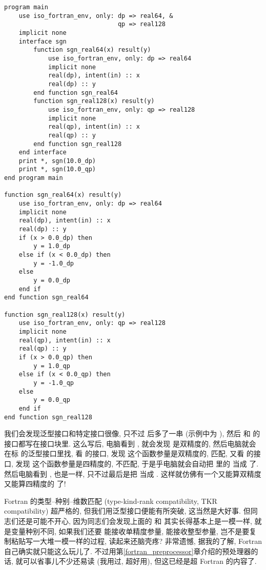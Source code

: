 \begin{lstlisting} 
program main
    use iso_fortran_env, only: dp => real64, &
                               qp => real128
    implicit none
    interface sgn
        function sgn_real64(x) result(y)
            use iso_fortran_env, only: dp => real64
            implicit none
            real(dp), intent(in) :: x
            real(dp) :: y
        end function sgn_real64
        function sgn_real128(x) result(y)
            use iso_fortran_env, only: qp => real128
            implicit none
            real(qp), intent(in) :: x
            real(qp) :: y
        end function sgn_real128
    end interface
    print *, sgn(10.0_dp)
    print *, sgn(10.0_qp)
end program main

function sgn_real64(x) result(y)
    use iso_fortran_env, only: dp => real64
    implicit none
    real(dp), intent(in) :: x
    real(dp) :: y
    if (x > 0.0_dp) then
        y = 1.0_dp
    else if (x < 0.0_dp) then
        y = -1.0_dp
    else
        y = 0.0_dp
    end if
end function sgn_real64

function sgn_real128(x) result(y)
    use iso_fortran_env, only: qp => real128
    implicit none
    real(qp), intent(in) :: x
    real(qp) :: y
    if (x > 0.0_qp) then
        y = 1.0_qp
    else if (x < 0.0_qp) then
        y = -1.0_qp
    else
        y = 0.0_qp
    end if
end function sgn_real128
\end{lstlisting} 
我们会发现泛型接口和特定接口很像, 只不过  后多了一串 (示例中为 ), 然后  和  的接口都写在接口块里. 这么写后, 电脑看到 , 就会发现  是双精度的, 然后电脑就会在标  的泛型接口里找, 看  的接口, 发现  这个函数参量是双精度的, 匹配, 又看  的接口, 发现  这个函数参量是四精度的, 不匹配, 于是乎电脑就会自动把  里的  当成  了. 然后电脑看到 , 也是一样, 只不过最后是把  当成 . 这样就仿佛有一个又能算双精度又能算四精度的  了!

Fortran 的类型--种别--维数匹配 (type-kind-rank compatibility, TKR compatibility) 超严格的, 但我们用泛型接口便能有所突破, 这当然是大好事. 但同志们还是可能不开心, 因为同志们会发现上面的  和  其实长得基本上是一模一样, 就是变量种别不同, 如果我们还要  能接收单精度参量, 能接收整型参量, 岂不是要复制粘贴写一大堆一模一样的过程, 读起来还脑壳疼? 非常遗憾, 据我的了解, Fortran 自己确实就只能这么玩儿了. 不过用第\ref{fortran_preprocessor}章介绍的预处理器的话, 就可以省事儿不少还易读 (我用过, 超好用), 但这已经是超 Fortran 的内容了. 

